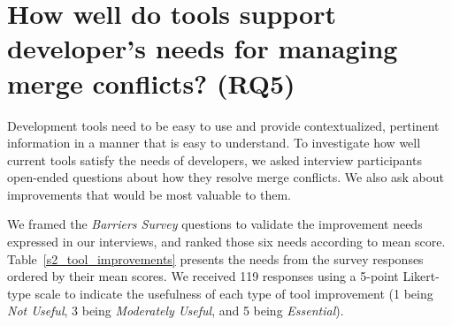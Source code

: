 
\section{How well do tools support developer's needs for managing merge conflicts? (RQ5)}\label{RQ5}

Development tools need to be easy to use and provide contextualized, pertinent information in a manner that is easy to understand.
To investigate how well current tools satisfy the needs of developers, we asked interview participants open-ended questions about how they resolve merge conflicts.
We also ask about improvements that would be most valuable to them.

We framed the \textit{Barriers Survey} questions to validate the improvement needs expressed in our interviews, and ranked those six needs according to mean score.
Table~\ref{s2_tool_improvements} presents the needs from the survey responses ordered by their mean scores.
We received 119 responses using a 5-point Likert-type scale to indicate the usefulness of each type of tool improvement (1 being \textit{Not Useful}, 3 being \textit{Moderately Useful}, and 5 being \textit{Essential}).

